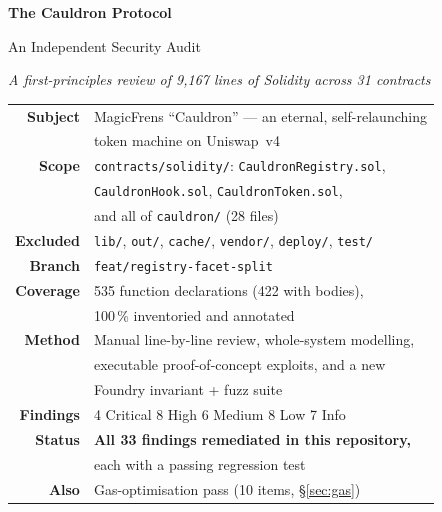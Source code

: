 \documentclass[10pt,a4paper]{article}
\begin{document}
\begin{titlepage}
\centering
\vspace*{2.2cm}
{\Huge\bfseries\color{cauldronblue} The Cauldron Protocol\par}
\vspace{0.5cm}
{\LARGE An Independent Security Audit\par}
\vspace{0.35cm}
{\large\itshape A first-principles review of 9{,}167 lines of Solidity across 31 contracts\par}
\vspace{1.6cm}

\begin{tabular}{@{}rl@{}}
\textbf{Subject} & MagicFrens ``Cauldron'' --- an eternal, self-relaunching\\
                 & token machine on Uniswap~v4\\[4pt]
\textbf{Scope}   & \texttt{contracts/solidity/}: \texttt{CauldronRegistry.sol},\\
                 & \texttt{CauldronHook.sol}, \texttt{CauldronToken.sol},\\
                 & and all of \texttt{cauldron/} (28 files)\\[4pt]
\textbf{Excluded} & \texttt{lib/}, \texttt{out/}, \texttt{cache/}, \texttt{vendor/}, \texttt{deploy/}, \texttt{test/}\\[4pt]
\textbf{Branch}  & \texttt{feat/registry-facet-split}\\[4pt]
\textbf{Coverage} & 535 function declarations (422 with bodies), \\
                 & 100\,\% inventoried and annotated\\[4pt]
\textbf{Method}  & Manual line-by-line review, whole-system modelling,\\
                 & executable proof-of-concept exploits, and a new\\
                 & Foundry invariant + fuzz suite\\[4pt]
\textbf{Findings} & 4 Critical \textbullet{} 8 High \textbullet{} 6 Medium \textbullet{} 8 Low \textbullet{} 7 Info\\[4pt]
\textbf{Status}  & \textbf{All 33 findings remediated in this repository,}\\
                 & each with a passing regression test\\[4pt]
\textbf{Also}    & Gas-optimisation pass (10 items, \S\ref{sec:gas})\\
\end{tabular}


\end{titlepage}
\end{document}
